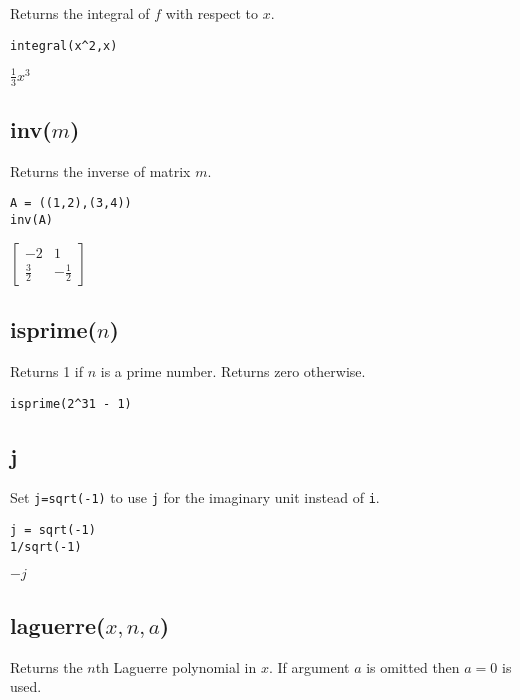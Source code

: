 Returns the integral of $f$ with respect to $x$.

{\color{blue}
\begin{verbatim}
integral(x^2,x)
\end{verbatim}
}

\noindent
$\displaystyle \tfrac{1}{3}x^3$

\subsection*{inv($m$)}

Returns the inverse of matrix $m$.

{\color{blue}
\begin{verbatim}
A = ((1,2),(3,4))
inv(A)
\end{verbatim}
}

\noindent
$\displaystyle
\begin{bmatrix}
-2 & 1\\
\tfrac{3}{2} & -\tfrac{1}{2}
\end{bmatrix}
$

\subsection*{isprime($n$)}

Returns 1 if $n$ is a prime number. Returns zero otherwise.

{\color{blue}
\begin{verbatim}
isprime(2^31 - 1)
\end{verbatim}
}


\subsection*{j}

Set {\tt j=sqrt(-1)} to use {\tt j} for the imaginary unit instead of {\tt i}.

{\color{blue}
\begin{verbatim}
j = sqrt(-1)
1/sqrt(-1)
\end{verbatim}
}

\noindent
$-j$

\subsection*{laguerre($x,n,a$)}

Returns the $n$th Laguerre polynomial in $x$.
If argument $a$ is omitted then $a=0$ is used.

